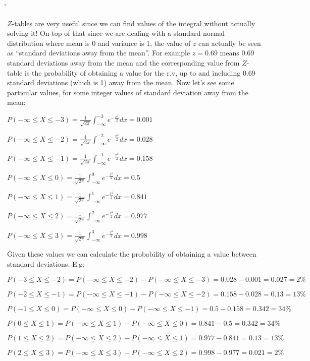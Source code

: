 \v

$Z$-tables are very useful since we can find values of the integral without actually solving it! On top of that since
we are dealing with a standard normal distribution where mean is 0 and variance is 1, the value of $z$ can actually
be seen as ``standard deviations away from the mean''. For example $z=0.69$ means 0.69 standard deviations away
from the mean and the corresponding value from $Z$-table is the probability of obtaining a value for the r.v, up to
and including 0.69 standard deviations (which is 1) away from the mean. \v

Now let's see some particular values, for some integer values of standard deviation away from the mean:
\bit
\item $P(-\infty \leq X \leq -3) = \frac{1}{\sqrt{2\pi}} \int_{-\infty}^{-3} e^{-\frac{x^2}{2}} dx = 0.001$
\item $P(-\infty \leq X \leq -2) = \frac{1}{\sqrt{2\pi}} \int_{-\infty}^{-2} e^{-\frac{x^2}{2}} dx = 0.028$
\item $P(-\infty \leq X \leq -1) = \frac{1}{\sqrt{2\pi}} \int_{-\infty}^{-1} e^{-\frac{x^2}{2}} dx = 0.158$
\item $P(-\infty \leq X \leq 0) = \frac{1}{\sqrt{2\pi}} \int_{-\infty}^{0} e^{-\frac{x^2}{2}} dx = 0.5$
\item $P(-\infty \leq X \leq 1) = \frac{1}{\sqrt{2\pi}} \int_{-\infty}^{1} e^{-\frac{x^2}{2}} dx = 0.841$
\item $P(-\infty \leq X \leq 2) = \frac{1}{\sqrt{2\pi}} \int_{-\infty}^{2} e^{-\frac{x^2}{2}} dx = 0.977$
\item $P(-\infty \leq X \leq 3) = \frac{1}{\sqrt{2\pi}} \int_{-\infty}^{3} e^{-\frac{x^2}{2}} dx = 0.998$
\eit

\v

Given these values we can calculate the probability of obtaining a value between standard deviations. E.g:
\bit
\item $P(-3 \leq X \leq -2) = P(-\infty \leq X \leq -2) - P(-\infty \leq X \leq -3) = 0.028 - 0.001 = 0.027 = 2\%$
\item $P(-2 \leq X \leq -1) = P(-\infty \leq X \leq -1) - P(-\infty \leq X \leq -2) = 0.158 - 0.028 = 0.13 = 13\%$
\item $P(-1 \leq X \leq 0) = P(-\infty \leq X \leq 0) - P(-\infty \leq X \leq -1) = 0.5 - 0.158 = 0.342 = 34\%$
\item $P(0 \leq X \leq 1) = P(-\infty \leq X \leq 1) - P(-\infty \leq X \leq 0) = 0.841 - 0.5 = 0.342 = 34\%$
\item $P(1 \leq X \leq 2) = P(-\infty \leq X \leq 2) - P(-\infty \leq X \leq 1) = 0.977 - 0.841 = 0.13 = 13\%$
\item $P(2 \leq X \leq 3) = P(-\infty \leq X \leq 3) - P(-\infty \leq X \leq 2) = 0.998 - 0.977 = 0.021 = 2\%$
\eit

